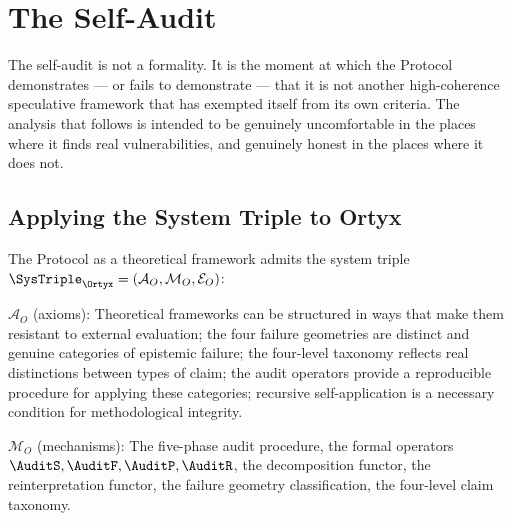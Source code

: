 
\chapter{The Self-Audit}
\label{ch:self-audit}


\noindent
The self-audit is not a formality. It is the moment
at which the \Ortyx{} Protocol demonstrates --- or fails
to demonstrate --- that it is not another high-coherence
speculative framework that has exempted itself from its
own criteria. The analysis that follows is intended to
be genuinely uncomfortable in the places where it finds
real vulnerabilities, and genuinely honest in the places
where it does not.

\section{Applying the System Triple to Ortyx}
\label{sec:ortyx-triple}

The \Ortyx{} Protocol as a theoretical framework admits
the system triple $\SysTriple_{\Ortyx} = (\mathcal{A}_O,
\mathcal{M}_O, \mathcal{E}_O)$:

$\mathcal{A}_O$ (axioms): Theoretical frameworks can
be structured in ways that make them resistant to
external evaluation; the four failure geometries are
distinct and genuine categories of epistemic failure;
the four-level taxonomy reflects real distinctions
between types of claim; the audit operators provide
a reproducible procedure for applying these categories;
recursive self-application is a necessary condition
for methodological integrity.

$\mathcal{M}_O$ (mechanisms): The five-phase audit
procedure, the formal operators $\AuditS, \AuditF,
\AuditP, \AuditR$, the decomposition functor, the
reinterpretation functor, the failure geometry
classification, the four-level claim taxonomy.

